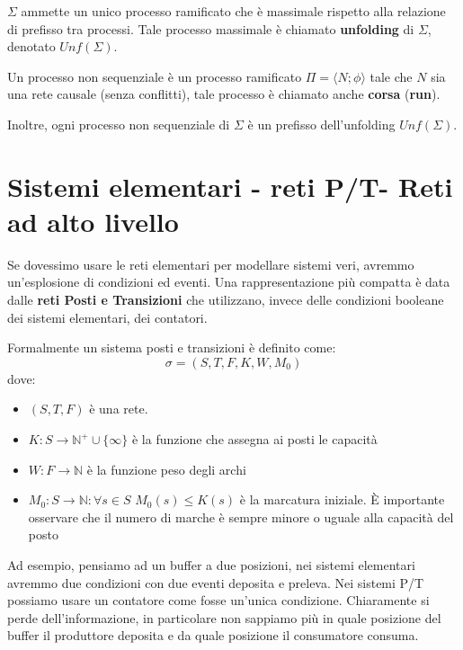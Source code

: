 \begin{definizione}
    $\Sigma$ ammette un unico processo ramificato che è massimale rispetto alla
    relazione di prefisso tra processi. Tale processo massimale è chiamato
    \textbf{unfolding} di $\Sigma$, denotato $Unf (\Sigma)$.
\end{definizione}
\begin{definizione}
    Un processo non sequenziale è un processo ramificato $\Pi = \langle N; \phi \rangle$
    tale che $N$ sia una rete causale (senza conflitti), tale processo è chiamato
    anche \textbf{corsa} (\textbf{run}).
\end{definizione}
\begin{osservazione}
    Inoltre, ogni processo non sequenziale di $\Sigma$ è un prefisso dell'unfolding
    $Unf (\Sigma)$.
\end{osservazione}
\section{Sistemi elementari - reti P/T- Reti ad alto livello}
Se dovessimo usare le reti elementari per modellare sistemi veri, avremmo
un'esplosione di condizioni ed eventi. Una rappresentazione più compatta è data
dalle \textbf{reti Posti e Transizioni} che utilizzano, invece delle condizioni
booleane dei sistemi elementari, dei contatori.
\begin{definizione}
    Formalmente un sistema posti e transizioni è definito come:
    \begin{equation}
        \sigma = (S, T, F, K, W, M_0)
    \end{equation}
    dove:
    \begin{itemize}
        \item $(S, T, F)$ è una rete.
        \item $K: S \to \mathbb{N}^+ \cup \{\infty\}$ è la funzione che assegna ai
              posti le capacità
        \item $W: F \to \mathbb{N}$ è la funzione peso degli archi
        \item $M_0: S \to \mathbb{N}: \forall s \in S$ $M_0(s) \leq K(s)$ è la
              marcatura iniziale. È importante osservare che il numero di marche è sempre
              minore o uguale alla capacità del posto
    \end{itemize}
\end{definizione}
Ad esempio, pensiamo ad un buffer a due posizioni, nei sistemi elementari avremmo
due condizioni con due eventi deposita e preleva. Nei sistemi P/T possiamo usare
un contatore come fosse un'unica condizione. Chiaramente si perde dell'informazione,
in particolare non sappiamo più in quale posizione del buffer il produttore
deposita e da quale posizione il consumatore consuma.

